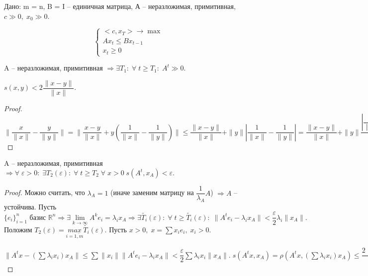 \begin{problem}
	Дано: m = n, B = I -- единичная матрица, А -- неразложимая, примитивная, $c \gg 0, \; x_0 \gg 0$. 

	$$\begin{cases}
		<c, x_T> \to \max\\
		Ax_t \leq B x_{t - 1}\\
		x_t \geq 0
	\end{cases}$$ 
\end{problem}

\begin{lemma}
	A -- неразложимая, примитивная $\Rightarrow \exists T_1: \; \forall \; t \geq T_1: \; A^t \gg 0.$
\end{lemma}

\begin{lemma}
	$s(x, y) < 2\dfrac{\| x - y\|}{\| x\|}.$
\end{lemma}

\begin{proof}
	$\| \dfrac{x}{\| x \|} - \dfrac{y}{\| y \|}\| = \| \dfrac{x - y}{\| x \|} + y (\dfrac{1}{\| x \|} - \dfrac{1}{\| y \|}) \| \leq \dfrac{\|x - y \|}{\| x \|} + \| y\| \left| \dfrac{1}{\| x \|} - \dfrac{1}{\| y \|}\right| = \dfrac{\|x - y \|}{\| x \|} + \| y\| \dfrac{\left| \dfrac{1}{\| x \|} - \dfrac{1}{\| y \|} \right|}{\| y\| \| x\|} \leq 2\dfrac{\| x - y\|}{\| x\|}.$
\end{proof}

\begin{lemma}
	A -- неразложимая, примитивная $\Rightarrow \forall \; \varepsilon > 0: \; \exists T_2(\varepsilon): \; \forall \; t \geq T_2 \; \forall \; x > 0 \; s(A^t, x_A) < \varepsilon.$
\end{lemma}

\begin{proof}
	Можно считать, что $\lambda_A = 1$ (иначе заменим матрицу на $\dfrac{1}{\lambda_A}A$) $\Rightarrow A$ -- устойчива. Пусть $\{ e_i\}_{i = 1}^n \text{ базис } \mathbb{R}^n \Rightarrow \exists \lim\limits_{k \to \infty} A^ke_i = \lambda_i x_A \Rightarrow \exists \tilde{T_i}(\varepsilon): \; \forall \; t \geq \tilde{T_i}(\varepsilon): \; \| A^te_i - \lambda_i x_A\| < \dfrac{\varepsilon}{2}\lambda_i \| x_A\|.$ Положим $T_2(\varepsilon) = \underset{i = \bar{1,m}}{max}\tilde{T_i}(\varepsilon)$. Пусть $x > 0, \; x = \sum x_i e_i, \; x_i > 0.$

	$\| A^tx - (\sum \lambda_i x_i)x_A\| \leq \sum \| x_i\| \| A^t e_i - \lambda_i x_A\| < \dfrac{\varepsilon}{2} \sum \lambda_i x_i \| x_A\|. \; s(A^tx, x_A) = \rho(A^tx, (\sum \lambda_i x_i)x_A) \leq \dfrac{2\| A^tx - (\sum \lambda_i x_i)x_A \|}{\|  (\sum \lambda_i x_i)x_A \|} < \dfrac{2 \frac{\varepsilon}{2} \sum \lambda_i x_i\|x_A\| }{\sum \lambda_i x_i\|x_A\|} = \varepsilon.$ 
\end{proof}

